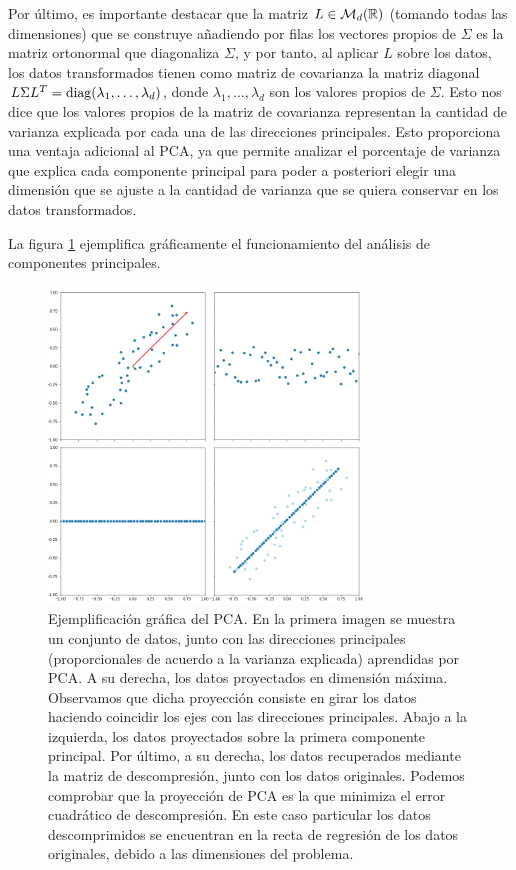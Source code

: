 Por último, es importante destacar que la matriz $L \in \mathcal{M}_{d}(\mathbb{R})$ (tomando todas las dimensiones) que se construye añadiendo por filas los vectores propios de $\Sigma$ es la matriz ortonormal que diagonaliza $\Sigma$, y por tanto, al aplicar $L$ sobre los datos, los datos transformados tienen como matriz de covarianza la matriz diagonal $L\Sigma L^T = \operatorname{diag}(\lambda_1,\dots,\lambda_d)$, donde $\lambda_1,\dots,\lambda_d$ son los valores propios de $\Sigma$. Esto nos dice que los valores propios de la matriz de covarianza representan la cantidad de varianza explicada por cada una de las direcciones principales. Esto proporciona una ventaja adicional al PCA, ya que permite analizar el porcentaje de varianza que explica cada componente principal para poder a posteriori elegir una dimensión que se ajuste a la cantidad de varianza que se quiera conservar en los datos transformados.

La figura \ref{fig:pca} ejemplifica gráficamente el funcionamiento del análisis de componentes principales.

\begin{figure}[h]
    \centering
    \includegraphics[width=0.75\textwidth]{./images/pca.png}
    \caption{Ejemplificación gráfica del PCA. En la primera imagen se muestra un conjunto de datos, junto con las direcciones principales (proporcionales de acuerdo a la varianza explicada) aprendidas por PCA. A su derecha, los datos proyectados en dimensión máxima. Observamos que dicha proyección consiste en girar los datos haciendo coincidir los ejes con las direcciones principales. Abajo a la izquierda, los datos proyectados sobre la primera componente principal. Por último, a su derecha, los datos recuperados mediante la matriz de descompresión, junto con los datos originales. Podemos comprobar que la proyección de PCA es la que minimiza el error cuadrático de descompresión. En este caso particular los datos descomprimidos se encuentran en la recta de regresión de los datos originales, debido a las dimensiones del problema.} \label{fig:pca}
\end{figure}

